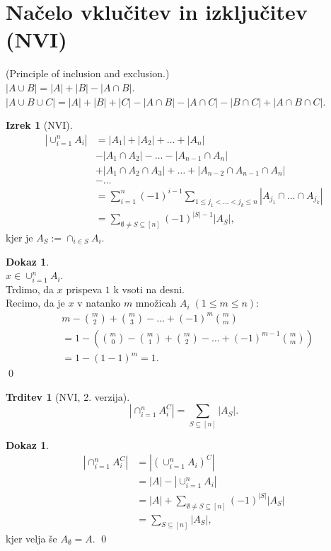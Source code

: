 \documentclass[a4paper, 12pt]{book}
\theoremstyle{definition}
\newtheorem{claim}[counter]{Trditev}
\newtheorem{theorem}[counter]{Izrek}
\newtheorem{pro}[counter]{Dokaz}
\theoremstyle{remark}
\begin{document}
\section{Načelo vklučitev in izključitev (NVI)}

(Principle of inclusion and exclusion.) \\
$|A \cup B| = |A| + |B| - |A \cap B|$. \\
$|A \cup B \cup C| = |A| + |B| + |C| - |A \cap B| - |A \cap C| - |B \cap C| + |A \cap B \cap C|$.
\begin{theorem}[NVI]
  \begin{align*}
    |\cup_{i=1}^n A_i| &= |A_1| + |A_2| + \dots + |A_n| \\
    &- |A_1 \cap A_2| - \dots - |A_{n-1} \cap A_n| \\
    &+ |A_1 \cap A_2 \cap A_3| + \dots + |A_{n-2} \cap A_{n-1} \cap A_n| \\
    &- \dots \\
    &= \sum_{i=1}^{n} (-1)^{i-1} \sum_{1 \leq j_1 < \dots < j_k \leq n} |A_{j_1} \cap \dots \cap A_{j_k}| \\
    &= \sum_{\emptyset \neq S \subseteq [n]} (-1)^{|S|-1} |A_S|,
  \end{align*}
  kjer je $A_S := \cap_{i \in S} A_i$.
\end{theorem}
\begin{pro} \text{} \\
  $x \in \cup_{i=1}^n A_i$. \\
  Trdimo, da $x$ prispeva $1$ k vsoti na desni. \\
  Recimo, da je $x$ v natanko $m$ množicah $A_i \; (1 \leq m \leq n)$:
  \begin{align*}
    &m - \binom{m}{2} + \binom{m}{3} - \dots + (-1)^{m} \binom{m}{m} \\
    &= 1 - \left(\binom{m}{0} - \binom{m}{1} + \binom{m}{2} - \dots + (-1)^{m-1} \binom{m}{m}\right) \\
    &= 1 - (1-1)^m = 1.
  \end{align*}
  \qed
\end{pro}
\begin{claim}[NVI, 2. verzija]
  \begin{equation*}
    \left|\cap_{i=1}^n A_i^C\right| = \sum_{S \subseteq [n]} |A_S|.
  \end{equation*}
\end{claim}
\begin{pro}
  \begin{align*}
    \left|\cap_{i=1}^n A_i^C\right| &= \left|(\cup_{i=1}^n A_i)^C\right| \\
    &= |A| - |\cup_{i=1}^n A_i| \\
    &= |A| + \sum_{\emptyset \neq S \subseteq [n]} (-1)^{|S|} |A_S| \\
    &= \sum_{S \subseteq [n]} |A_S|,
  \end{align*}
  kjer velja še $A_{\emptyset} = A$.
  \qed
\end{pro}
\end{document}

